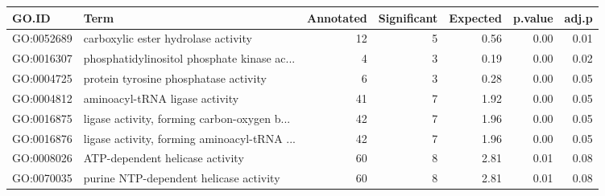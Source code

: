 \begin{table}[ht]
\centering
\begin{tabular}{llrrrrr}
  \hline
GO.ID & Term & Annotated & Significant & Expected & p.value & adj.p \\ 
  \hline
GO:0052689 & carboxylic ester hydrolase activity &  12 &   5 & 0.56 & 0.00 & 0.01 \\ 
  GO:0016307 & phosphatidylinositol phosphate kinase ac... &   4 &   3 & 0.19 & 0.00 & 0.02 \\ 
  GO:0004725 & protein tyrosine phosphatase activity &   6 &   3 & 0.28 & 0.00 & 0.05 \\ 
  GO:0004812 & aminoacyl-tRNA ligase activity &  41 &   7 & 1.92 & 0.00 & 0.05 \\ 
  GO:0016875 & ligase activity, forming carbon-oxygen b... &  42 &   7 & 1.96 & 0.00 & 0.05 \\ 
  GO:0016876 & ligase activity, forming aminoacyl-tRNA ... &  42 &   7 & 1.96 & 0.00 & 0.05 \\ 
  GO:0008026 & ATP-dependent helicase activity &  60 &   8 & 2.81 & 0.01 & 0.08 \\ 
  GO:0070035 & purine NTP-dependent helicase activity &  60 &   8 & 2.81 & 0.01 & 0.08 \\ 
   \hline
\end{tabular}
\end{table}
